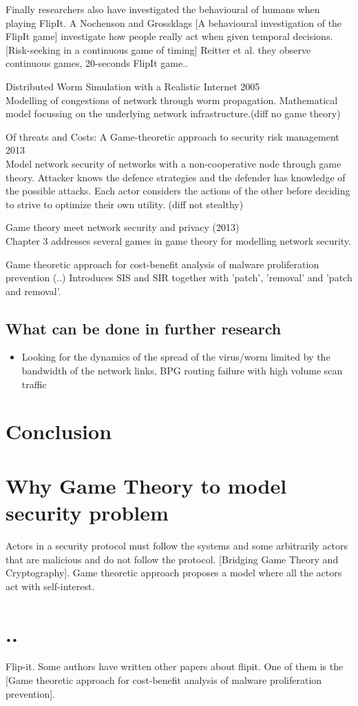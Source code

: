 Finally researchers also have investigated the behavioural of humans when playing FlipIt. A Nochenson and Grossklags [A behavioural investigation of the FlipIt game]  investigate how people really act when given temporal decisions. [Risk-seeking in a continuous game of timing] Reitter et al. they observe continuous games, 20-seconds FlipIt game..




\begin{description}
\item Distributed Worm Simulation with a Realistic Internet 2005  \\
Modelling of congestions of network through worm propagation. Mathematical model focussing on the underlying network infrastructure.(diff no game theory) 
\item Of threats and Costs: A Game-theoretic approach to security risk management 2013\\
Model network security of networks with a non-cooperative node through game theory. Attacker knows the defence strategies and the defender has knowledge of the possible attacks. Each actor considers the actions of the other before deciding to strive to optimize their own utility. (diff not stealthy)
\item Game theory meet network security and privacy (2013) \\
Chapter 3 addresses several games in game theory for modelling network security.
\item Game theoretic approach for cost-benefit analysis of malware proliferation prevention (..)
Introduces SIS and SIR together with 'patch', 'removal' and 'patch and removal'.
\end{description}

\subsection{What can be done in further research}
\begin{itemize}
\item Looking for the dynamics of the spread of the virus/worm limited by the bandwidth of the network links, BPG routing failure with high volume scan traffic
\end{itemize}
\section{Conclusion}

\section{Why Game Theory to model security problem}
Actors in a security protocol must follow the systems and some arbitrarily actors that are malicious and do not follow the protocol. [Bridging Game Theory and Cryptography]. Game theoretic approach proposes a model where all the actors act with self-interest. 

\section{..}

Flip-it. Some authors have written other papers about flipit. One of them is the [Game theoretic approach for cost-benefit analysis of malware proliferation prevention]. 





